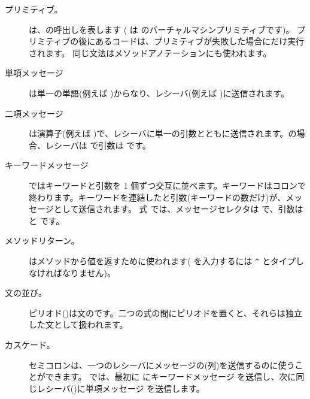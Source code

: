 \documentclass[a4paper,10pt,twoside]{book}
\begin{document}
\begin{description}
\item[プリミティブ。] は、の呼出しを表します
	( は  のバーチャルマシンプリミティブです)。
	プリミティブの後にあるコードは、プリミティブが失敗した場合にだけ実行されます。
	同じ文法はメソッドアノテーションにも使われます。

\item[単項メッセージ] は単一の単語(例えば )からなり、レシーバ(例えば )に送信されます。

\item[二項メッセージ] は演算子(例えば \ct{+})で、レシーバに単一の引数とともに送信されます。の場合、レシーバは  で引数は  です。

\item[キーワードメッセージ] ではキーワードと引数を 1 個ずつ交互に並べます。キーワードはコロンで終わります。キーワードを連結したと引数(キーワードの数だけ)が、メッセージとして送信されます。
式  では、メッセージセレクタは  で、引数は  と  です。

\item[メソッドリターン。] \ct{^}はメソッドから値を返すために使われます(\ct{^} を入力するには \verb|^| とタイプしなければなりません)。

\item[文の並び。] ピリオド()は文のです。二つの式の間にピリオドを置くと、それらは独立した文として扱われます。

\item[カスケード。] セミコロンは、一つのレシーバにメッセージの(列)を送信するのに使うことができます。 では、最初に  にキーワードメッセージ  を送信し、次に同じレシーバ()に単項メッセージ  を送信します。

\end{description}
\end{document}
